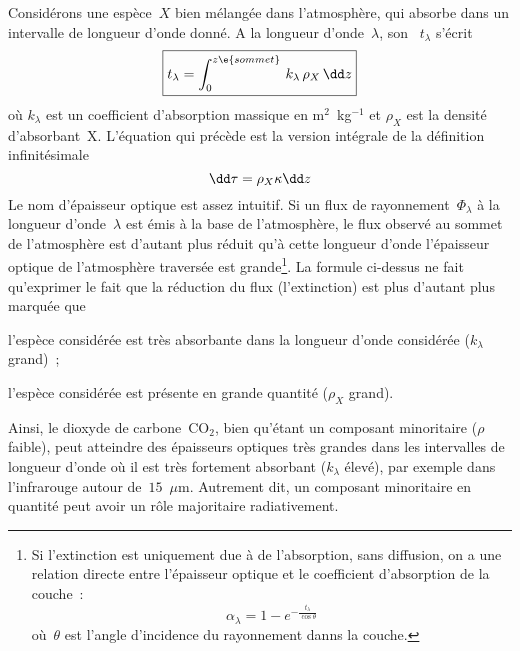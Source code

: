 \sk
Considérons une espèce~$X$ bien mélangée dans l'atmosphère, qui absorbe dans un intervalle de longueur d'onde donné. A la longueur d'onde~$\lambda$, son ~$t_\lambda$ s'écrit
\[ \boxed{ t_\lambda = \int_{0}^{z\e{sommet}} \, k_\lambda \, \rho_X \, \dd z } \]
où $k_\lambda$ est un coefficient d'absorption massique en m$^2$~kg$^{-1}$ et $\rho_X$ est la densité d'absorbant~X. L'équation qui précède est la version intégrale de la définition infinitésimale
\[ \EO \]
\noindent Le nom d'épaisseur optique est assez intuitif. Si un flux de rayonnement~$\Phi_\lambda$ à la longueur d'onde~$\lambda$ est émis à la base de l'atmosphère, le flux observé au sommet de l'atmosphère est d'autant plus réduit qu'à cette longueur d'onde l'épaisseur optique de l'atmosphère traversée est grande\footnote{Si l'extinction est uniquement due à de l'absorption, sans diffusion, on a une relation directe entre l'épaisseur optique et le coefficient d'absorption de la couche~: 
\[\alpha_\lambda = 1 - e^{- \frac{t_\lambda}{\cos\theta}} \] où~$\theta$ est l'angle d'incidence du rayonnement danns la couche.}. La formule ci-dessus ne fait qu'exprimer le fait que la réduction du flux (l'extinction) est plus d'autant plus marquée que 
\begin{citemize}
\item l'espèce considérée est très absorbante dans la longueur d'onde considérée ($k_\lambda$ grand)~;
\item l'espèce considérée est présente en grande quantité ($\rho_X$ grand).
\end{citemize}
Ainsi, le dioxyde de carbone~CO$_2$, bien qu'étant un composant minoritaire ($\rho$ faible), peut atteindre des épaisseurs optiques très grandes dans les intervalles de longueur d'onde où il est très fortement absorbant ($k_\lambda$ élevé), par exemple dans l'infrarouge autour de~$15$~$\mu$m. Autrement dit, un composant minoritaire en quantité peut avoir un rôle majoritaire radiativement.
